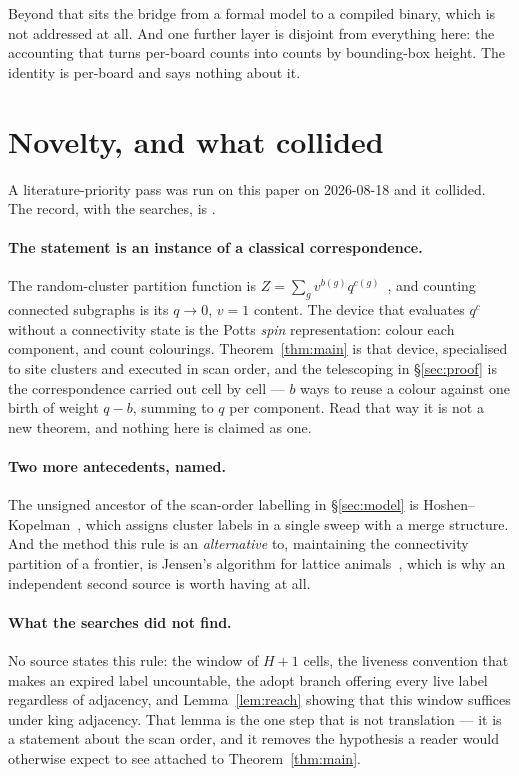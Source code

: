 \documentclass[11pt]{article}
\begin{document}
Beyond that sits the bridge from a formal model to a compiled binary, which is
not addressed at all. And one further layer is disjoint from everything here: the
accounting that turns per-board counts into counts by bounding-box height. The
identity is per-board and says nothing about it.

\section{Novelty, and what collided}
\label{sec:novelty}

A literature-priority pass was run on this paper on 2026-08-18 and it collided.
The record, with the searches, is .

\paragraph{The statement is an instance of a classical correspondence.} The
random-cluster partition function is
$Z = \sum_g v^{b(g)}q^{c(g)}$~\cite{fortuinKasteleyn1972}, and counting
connected subgraphs is its $q \to 0$, $v = 1$ content. The device that evaluates
$q^{c}$ without a connectivity state is the Potts \emph{spin} representation:
colour each component, and count colourings. Theorem~\ref{thm:main} is that
device, specialised to site clusters and executed in scan order, and the
telescoping in \S\ref{sec:proof} is the correspondence carried out cell by cell
--- $b$ ways to reuse a colour against one birth of weight $q - b$, summing to
$q$ per component. Read that way it is not a new theorem, and nothing here is
claimed as one.

\paragraph{Two more antecedents, named.} The unsigned ancestor of the scan-order
labelling in \S\ref{sec:model} is Hoshen--Kopelman~\cite{hoshenKopelman1976},
which assigns cluster labels in a single sweep with a merge structure. And the
method this rule is an \emph{alternative} to, maintaining the connectivity
partition of a frontier, is Jensen's algorithm for lattice
animals~\cite{jensen2001}, which is why an independent second source is worth
having at all.

\paragraph{What the searches did not find.} No source states this rule: the
window of $H+1$ cells, the liveness convention that makes an expired label
uncountable, the adopt branch offering every live label regardless of adjacency,
and Lemma~\ref{lem:reach} showing that this window suffices under king
adjacency. That lemma is the one step that is not translation --- it is a
statement about the scan order, and it removes the hypothesis a reader
would otherwise expect to see attached to Theorem~\ref{thm:main}.
\end{document}
